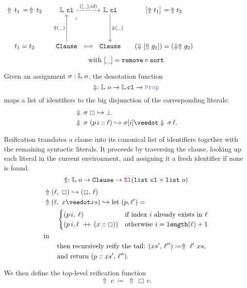 \begin{center}
\(\begin{tikzcd}[ampersand replacement=\&,column sep=small]
	{\Uparrow\,t_1 \,=\, \Uparrow\,t_2} \& \bb{L}~\kw{cl} \&\& \bb{L}~\kw{cl} \& {[\Uparrow t_1] \,=\, \Uparrow t_2} \\
	\\
	{t_1 = t_2} \& \kw{Clause} \&\& \kw{Clause} \& {(\den{[\Uparrow g_1]}) = (\den{\Uparrow g_2})}
	\arrow["({[\_], id)}", dashed, from=1-2, to=1-4]
	\arrow["\lrcorner"{anchor=center, pos=0.125}, draw=none, from=1-2, to=3-4]
	\arrow["{\Downarrow(\_)}", from=1-4, to=3-4]
	\arrow["{\Uparrow(\_)}", from=3-2, to=1-2]
	\arrow["\iff"{description}, dotted, no head, from=3-2, to=3-4]
\end{tikzcd}\)
\[
  \text{with } [\_] = \texttt{\upshape{remove}} \circ \texttt{\upshape{sort}}
\]
\end{center}


\begin{definition}[Denotation]\label{def:denotation}
Given an assignment $\sigma : \mathbb{L}~o$, the denotation function
\[
  \Downarrow : \bb{L}~o \to \bb{L}\,\kw{cl} \to \prop
\]
maps a list of identifiers to the big disjunction of the corresponding literals:
\begin{align*}
&\Downarrow\,\sigma~\Box \re \bot \\
&\Downarrow\,\sigma~(p\,i :: \ell) \re \sigma[i] \mathbin{\veedot} \Downarrow\,\sigma\,\ell.
\end{align*}
\end{definition}

\begin{definition}\label{def:reify}
Reification translates a clause into its canonical list of identifiers together with 
the remaining syntactic literals. It proceeds by traversing the clause, 
looking up each literal in the current environment, and assigning it a fresh identifier if none is found.
\[
  \Uparrow  : \bb{L}~o \to \kw{Clause} \to \el (\kw{list}~\kw{cl} \times \kw{list}~o)
\]
\begin{align*}
&\Uparrow (\ell,\;\Box) \re (\Box,\,\ell) \\
&\Uparrow (\ell,\; x \veedot xs) \re \text{let } (p, \ell') = \\
&\qquad\begin{cases}
  (p\,i ,\; \ell) & \text{if index }  i \text{ already exists in } \ell \\
  (p\,i, \ell \concat (x::\Box)) & \text{otherwise } i = \kw{length}(\ell) + 1
\end{cases} \\
&\text{in}\\
&\qquad \text{then recursively reify the tail: } (xs',\,\ell'') \coloneq \Uparrow~\ell'~xs, \\
&\qquad \text{and return } (p :: xs',\, \ell'').
\end{align*}

\noindent
We then define the top-level reification function
\[
  \Uparrow \;c \;\coloneqq\; \Uparrow \,\Box\,c.
\]
\end{definition}

